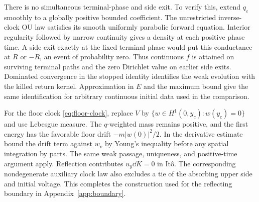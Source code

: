 There is no simultaneous terminal-phase and side exit.
To verify this, extend $q_\varepsilon$ smoothly to a
globally positive bounded coefficient. The unrestricted
inverse-clock OU law satisfies its smooth uniformly
parabolic forward equation. Interior regularity followed
by narrow continuity gives a density at each positive
phase time. A side exit exactly at the fixed terminal
phase would put this conductance at $R$ or $-R$,
an event of probability zero. Thus continuous $f$ is
attained on surviving terminal paths and the zero
Dirichlet value on earlier side exits. Dominated
convergence in the stopped identity identifies the
weak evolution with the killed return kernel.
Approximation in $E$ and the maximum bound give the
same identification for arbitrary continuous initial
data used in the comparison.

For the floor clock \eqref{eq:floor-clock}, replace $V$
by $\{w\in H^1(0,y_c):w(y_c)=0\}$ and use Lebesgue
measure. The $q$-weighted mass remains positive, and
the first energy has the favorable floor drift
$-m|w(0)|^2/2$. In the derivative estimate bound the
drift term against $w_v$ by Young's inequality before
any spatial integration by parts. The same weak
passage, uniqueness, and positive-time argument apply.
Reflection contributes $u_y\dd K=0$ in It\^o.
The corresponding nondegenerate auxiliary clock law
also excludes a tie of the absorbing upper side
and initial voltage. This completes the construction
used for the reflecting boundary in Appendix~\ref{app:boundary}.
